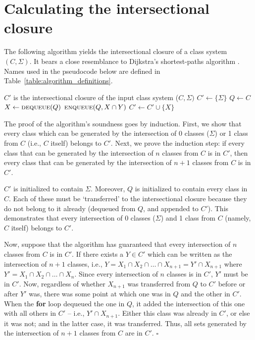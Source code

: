 \documentclass[12pt, oneside]{article}   	%
\begin{document}
\appendix

\section{Calculating the intersectional closure}
\label{app:closure}
The following algorithm yields the intersectional closure of a class system $(C, \Sigma)$. It bears a close resemblance to Dijkstra's shortest-paths algorithm \cite{Dijkstra1959}. Names used in the pseudocode below are defined in Table~\ref{table:algorithm_definitions}.
\noindent \begin{algorithmic}
	\singlespacing
	\ENSURE $C'$ is the intersectional closure of the input class system ($C, \Sigma)$
	\STATE
	\STATE $C' \leftarrow \{ \Sigma \} $
	\STATE $Q \leftarrow C$
	\STATE
	\STATE $X \leftarrow \textsc{dequeue}(Q)$
	\STATE $\textsc{enqueue}(Q, X \cap Y)$
	\ENDFOR
	\STATE $C' \leftarrow C' \cup \{ X \}$
	\ENDIF
	\ENDWHILE
\end{algorithmic}
\doublespacing

\noindent The proof of the algorithm's soundness goes by induction. First, we show that every class which can be generated by the intersection of $0$ classes ($\Sigma$) or 1 class from $C$ (i.e., $C$ itself) belongs to $C'$. Next, we prove the induction step: if every class that can be generated by the intersection of $n$ classes from $C$ is in $C'$, then every class that can be generated by the intersection of $n+1$ classes from $C$ is in $C'$.

$C'$ is initialized to contain $\Sigma$. Moreover, $Q$ is initialized to contain every class in $C$. Each of these must be `transferred' to the intersectional closure because they do not belong to it already (dequeued from $Q$, and appended to $C'$). This demonstrates that every intersection of 0 classes ($\Sigma$) and 1 class from $C$ (namely, $C$ itself) belongs to $C'$.

Now, suppose that the algorithm has guaranteed that every intersection of $n$ classes from $C$ is in $C'$. If there exists a $Y \in C'$ which can be written as the intersection of $n+1$ classes, i.e., $Y = X_1 \cap X_2 \cap \ldots \cap X_{n+1} = Y' \cap X_{n+1}$ where $Y' = X_1 \cap X_2 \cap \ldots \cap X_n$. Since every intersection of $n$ classes is in $C'$, $Y'$ must be in $C'$. Now, regardless of whether $X_{n+1}$ was transferred from $Q$ to $C'$ before or after $Y'$ was, there was some point at which one was in $Q$ and the other in $C'$. When the \textbf{for} loop dequeued the one in $Q$, it added the intersection of this one with all others in $C'$ -- i.e., $Y' \cap X_{n+1}$. Either this class was already in $C'$, or else it was not; and in the latter case, it was transferred. Thus, all sets generated by the intersection of $n+1$ classes from $C$ are in $C'$. $\square$
\end{document}
